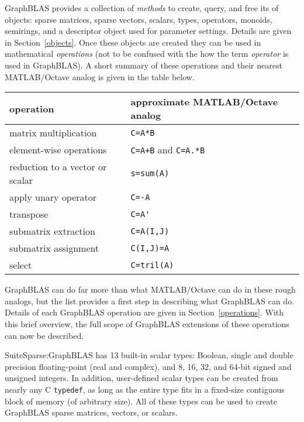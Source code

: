 \documentclass[12pt]{article}
\begin{document}
GraphBLAS provides a collection of {\em methods} to create, query, and free its
of objects: sparse matrices, sparse vectors, scalars, types, operators,
monoids, semirings, and a descriptor object used for parameter settings.
Details are given in Section~\ref{objects}.  Once these objects are created
they can be used in mathematical {\em operations} (not to be confused with the
how the term {\em operator} is used in GraphBLAS).  A short summary of these
operations and their nearest MATLAB/Octave analog is given in the table below.

\begin{tabular}{ll}
operation                           & approximate MATLAB/Octave analog \\
\hline
matrix multiplication               & \verb'C=A*B' \\
element-wise operations             & \verb'C=A+B' and \verb'C=A.*B' \\
reduction to a vector or scalar     & \verb's=sum(A)' \\
apply unary operator                & \verb'C=-A' \\
transpose                           & \verb"C=A'" \\
submatrix extraction                & \verb'C=A(I,J)' \\
submatrix assignment                & \verb'C(I,J)=A' \\
select                              & \verb'C=tril(A)' \\
\hline
\end{tabular}
\vspace{0.1in}

GraphBLAS can do far more than what MATLAB/Octave can do in these rough
analogs, but the list provides a first step in describing what GraphBLAS can
do.  Details of each GraphBLAS operation are given in Section~\ref{operations}.
With this brief overview, the full scope of GraphBLAS extensions of these
operations can now be described.

SuiteSparse:GraphBLAS has 13 built-in scalar types: Boolean, single and double
precision floating-point (real and complex), and 8, 16, 32, and 64-bit signed
and unsigned integers.  In addition, user-defined scalar types can be created
from nearly any C \verb'typedef', as long as the entire type fits in a
fixed-size contiguous block of memory (of arbitrary size).  All of these types
can be used to create GraphBLAS sparse matrices, vectors, or scalars.
\end{document}
